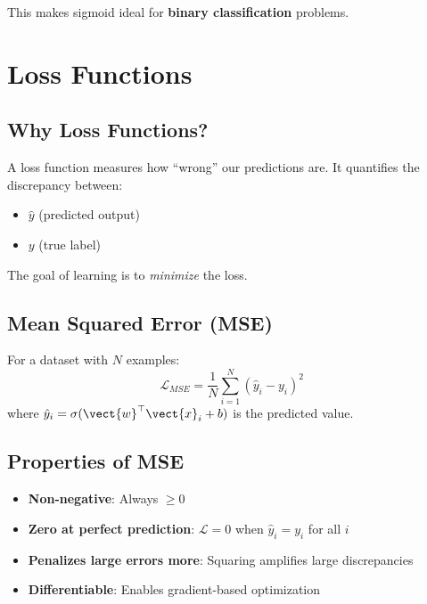 This makes sigmoid ideal for \textbf{binary classification} problems.


\section{Loss Functions}

\subsection{Why Loss Functions?}

A loss function measures how ``wrong'' our predictions are. It quantifies the discrepancy between:
\begin{itemize}
    \item $\hat{y}$ (predicted output)
    \item $y$ (true label)
\end{itemize}

The goal of learning is to \textit{minimize} the loss.

\subsection{Mean Squared Error (MSE)}

\begin{definitionbox}
For a dataset with $N$ examples:
\[
\mathcal{L}_{MSE} = \frac{1}{N} \sum_{i=1}^{N} (\hat{y}_i - y_i)^2
\]
where $\hat{y}_i = \sigma(\vect{w}^\top \vect{x}_i + b)$ is the predicted value.
\end{definitionbox}

\subsection{Properties of MSE}

\begin{itemize}
    \item \textbf{Non-negative}: Always $\geq 0$
    \item \textbf{Zero at perfect prediction}: $\mathcal{L} = 0$ when $\hat{y}_i = y_i$ for all $i$
    \item \textbf{Penalizes large errors more}: Squaring amplifies large discrepancies
    \item \textbf{Differentiable}: Enables gradient-based optimization
\end{itemize}

